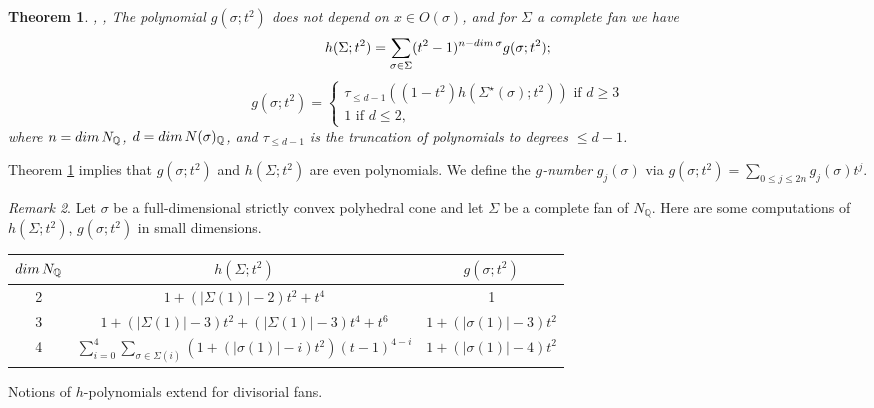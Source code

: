 \documentclass[11pt, reqno]{amsart}
\theoremstyle{plain}
\newtheorem{theorem}{Theorem}[section]
\theoremstyle{definition}
\theoremstyle{remark}
\newtheorem{remark}[theorem]{Remark}
\begin{document}
\begin{theorem}\cite[Theorem 1.1 and Theorem 1.2]{Fie91}, \cite[Section 6]{DL91}, \cite[Section 5]{BBFK02} \label{Theo-hpolgpol}
The polynomial $g(\sigma; t^{2})$ does not depend on $x\in O(\sigma)$, and for $\Sigma$ a complete fan we have
$$h(\Sigma; t^{2}) =  \sum_{\sigma\in\Sigma}(t^{2}-1)^{n-{\rm dim}\, \sigma}g(\sigma; t^{2});$$
$$g(\sigma; t^{2}) = \begin{cases} \tau_{\leq d-1}((1-t^{2})h(\Sigma^{\star}(\sigma); t^{2}))\text{  if } d\geq 3 \\   1 \text{ if } d\leq 2,  \end{cases}$$
where $n =  {\rm dim}\, N_{\mathbb{Q}}$, $d  =  {\rm dim}\, N(\sigma)_{\mathbb{Q}}$, and $\tau_{\leq d-1}$ is the truncation of polynomials to degrees $\leq d-1$. 
\end{theorem}
Theorem \ref{Theo-hpolgpol} implies that $g(\sigma; t^{2})$ and $h(\Sigma; t^{2})$ are even polynomials. We define the \emph{$g$-number} $g_{j}(\sigma)$ via
$g(\sigma; t^{2}) =  \sum_{0\leq j\leq 2n}g_{j}(\sigma)t^{j}.$
\begin{remark}\label{rem-hpolexplicit234} \cite[Section 1, Remark (iii)]{Fie91} Let $\sigma$ be a full-dimensional strictly convex polyhedral cone and let $\Sigma$ be a complete fan of  $N_{\mathbb{Q}}$. Here are some computations of $h(\Sigma; t^{2})$, $g(\sigma; t^{2})$ in small dimensions.
\begin{center}
 \begin{tabular}{ |c|c| c|}
 \hline
  ${\rm dim}\, N_{\mathbb{Q}}$ & $h(\Sigma; t^{2})$  & $g(\sigma; t^{2})$\\ 
 \hline\hline
  2 &  $1  + ( |\Sigma(1)| - 2)t^{2} +  t^{4}$  & 1\\ 
 \hline
  3   & $1  + ( |\Sigma(1)| - 3)t^{2} + (|\Sigma(1)| - 3)t^{4} +  t^{6}$ & $1  + ( |\sigma(1)| - 3)t^{2}$\\   
 \hline
  4  & $\sum_{i = 0}^{4}\sum_{\sigma \in \Sigma(i)}(1 + (|\sigma(1)| - i)t^{2}) (t-1)^{4-i}$ & $1  + ( |\sigma(1)| - 4)t^{2}$\\   
 \hline
\end{tabular}
\end{center}
\end{remark}



Notions of $h$-polynomials extend for divisorial fans. 
\end{document}
